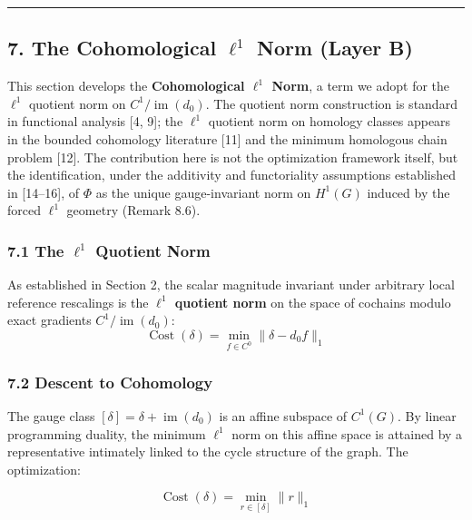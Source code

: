 \documentclass[
]{article}
\begin{document}
\begin{center}\rule{0.5\linewidth}{0.5pt}\end{center}

\subsection{\texorpdfstring{7. The Cohomological \(\ell^1\) Norm
\textbf{(Layer
B)}}{7. The Cohomological \textbackslash ell\^{}1 Norm (Layer B)}}\label{the-cohomological-ell1-norm-layer-b}

This section develops the \textbf{Cohomological \(\ell^1\) Norm}, a term
we adopt for the \(\ell^1\) quotient norm on
\(C^1/\operatorname{im}(d_0)\). The quotient norm construction is
standard in functional analysis {[}4, 9{]}; the \(\ell^1\) quotient norm
on homology classes appears in the bounded cohomology literature
{[}11{]} and the minimum homologous chain problem {[}12{]}. The
contribution here is not the optimization framework itself, but the
identification, under the additivity and functoriality assumptions
established in {[}14--16{]}, of \(\Phi\) as the unique gauge-invariant
norm on \(H^1(G)\) induced by the forced \(\ell^1\) geometry (Remark
8.6).

\subsubsection{\texorpdfstring{7.1 The \(\ell^1\) Quotient
Norm}{7.1 The \textbackslash ell\^{}1 Quotient Norm}}\label{the-ell1-quotient-norm}

As established in Section 2, the scalar magnitude invariant under
arbitrary local reference rescalings is the \textbf{\(\ell^1\) quotient
norm} on the space of cochains modulo exact gradients
\(C^1 / \operatorname{im}(d_0)\):
\[ \operatorname{Cost}(\delta) = \min_{f \in C^0} \|\delta - d_0 f\|_1 \]

\subsubsection{7.2 Descent to Cohomology}\label{descent-to-cohomology}

The gauge class \([\delta] = \delta + \operatorname{im}(d_0)\) is an
affine subspace of \(C^1(G)\). By linear programming duality, the
minimum \(\ell^1\) norm on this affine space is attained by a
representative intimately linked to the cycle structure of the graph.
The optimization:

\[ \operatorname{Cost}(\delta) = \min_{r \in [\delta]} \|r\|_1 \]
\end{document}
